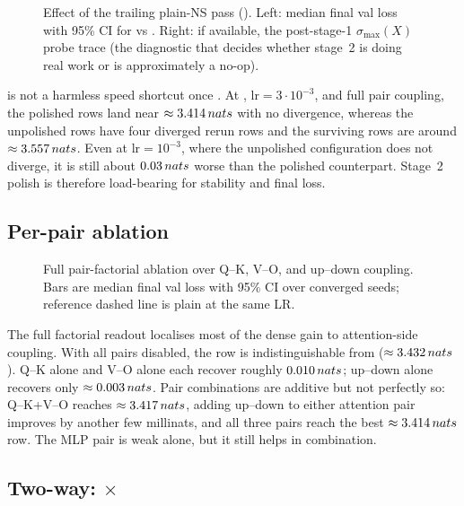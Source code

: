 \begin{figure}[h]
\centering
{}
\caption{Effect of the trailing plain-NS pass (). Left: median final val loss with 95\% CI for  vs . Right: if available, the post-stage-1 $\sigma_{\max}(X)$ probe trace (the diagnostic that decides whether stage~2 is doing real work or is approximately a no-op).}\label{fig:d4-final-polish}
\end{figure}

 is not a harmless speed shortcut once . At , $\mathrm{lr}=3\!\cdot\!10^{-3}$, and full pair coupling, the polished rows land near $\approx 3.414\,nats{}$ with no divergence, whereas the unpolished rows have four diverged rerun rows and the surviving rows are around $\approx 3.557\,nats{}$. Even at $\mathrm{lr}=10^{-3}$, where the unpolished configuration does not diverge, it is still about $0.03\,nats{}$ worse than the polished counterpart. Stage~2 polish is therefore load-bearing for stability and final loss.

\subsection{Per-pair ablation}

\begin{figure}[h]
\centering
{}
\caption{Full pair-factorial ablation over Q--K, V--O, and up--down coupling. Bars are median final val loss with 95\% CI over converged seeds; reference dashed line is plain \optMuon{} at the same LR.}\label{fig:d4-per-pair}
\end{figure}

The full factorial readout localises most of the dense gain to attention-side coupling. With all pairs disabled, the row is indistinguishable from \optMuon{} ($\approx 3.432\,nats{}$). Q--K alone and V--O alone each recover roughly $0.010\,nats{}$; up--down alone recovers only $\approx 0.003\,nats{}$. Pair combinations are additive but not perfectly so: Q--K+V--O reaches $\approx 3.417\,nats{}$, adding up--down to either attention pair improves by another few millinats, and all three pairs reach the best $\approx 3.414\,nats{}$ row. The MLP pair is weak alone, but it still helps in combination.

\subsection{Two-way:  $\times$ }

